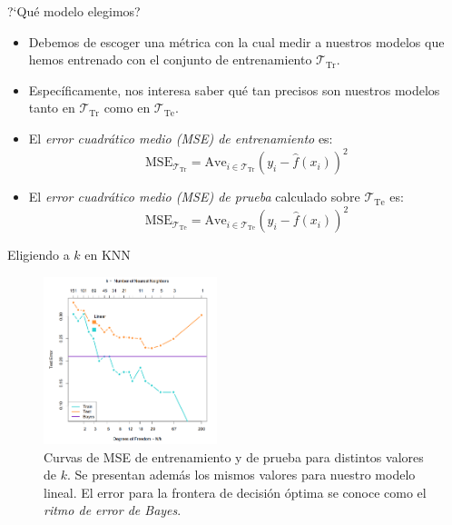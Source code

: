 \documentclass[usenames,dvipsnames]{beamer} %
\newcommand\defi[1]{\textcolor{NavyBlue}{\textit{#1}}}
\begin{document}
\begin{frame}{?`Qu\'e modelo elegimos?}
	\begin{itemize}
		\item Debemos de escoger una m\'etrica con la cual medir a nuestros modelos que hemos entrenado con el conjunto de entrenamiento $\mathcal{T}_{\text{Tr}}$.
		\item Espec\'ificamente, nos interesa saber qu\'e tan precisos son nuestros modelos tanto en $\mathcal{T}_{\text{Tr}}$ como en $\mathcal{T}_{\text{Te}}$.
		\item El \defi{error cuadr\'atico medio (MSE) de entrenamiento} es:
		\begin{equation}\label{eq:1_trainmse}
		\text{MSE}_{\mathcal{T}_{\text{Tr}}} = \text{Ave}_{i \in \mathcal{T}_{\text{Tr}}}(y_i - \hat{f}(x_i))^2
		\end{equation}
		\item El \defi{error cuadr\'atico medio (MSE) de prueba} calculado sobre $\mathcal{T}_{\text{Te}}$ es:
		\begin{equation}\label{eq:1_testmse}
		\text{MSE}_{\mathcal{T}_{\text{Te}}} = \text{Ave}_{i \in \mathcal{T}_{\text{Te}}}(y_i - \hat{f}(x_i))^2
		\end{equation}
	\end{itemize}
\end{frame}

\begin{frame}{Eligiendo a $k$ en KNN}
\begin{figure}\label{fig:1_errorKNN}
	\centering
	\includegraphics[width=0.45\textwidth]{images/esl/fig_2_4.PNG}
	\caption{Curvas de MSE de entrenamiento y de prueba para distintos valores de $k$. Se presentan adem\'as los mismos valores para nuestro modelo lineal. El error para la frontera de decisi\'on \'optima se conoce como el \defi{ritmo de error de Bayes}.}
\end{figure}

\end{frame}
\end{document}
